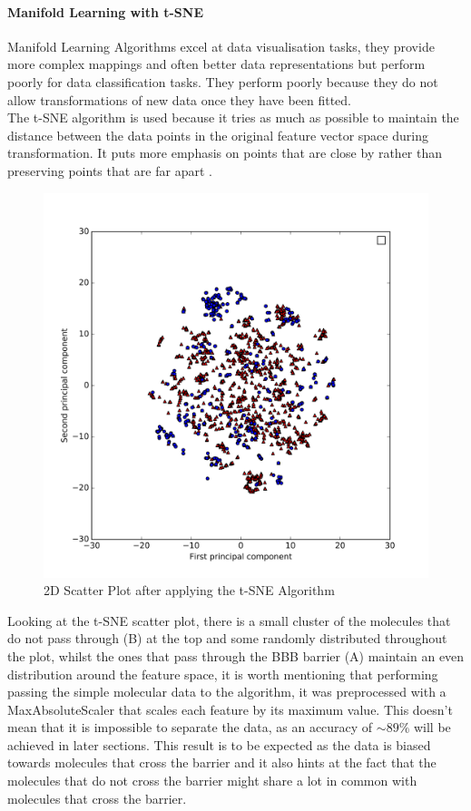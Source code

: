 \documentclass[a4paper,12pt]{report}
\begin{document}
			\paragraph{Manifold Learning with t-SNE}
			Manifold Learning Algorithms excel at data visualisation tasks, they provide more complex mappings and often better data representations but perform poorly for data classification tasks. They perform poorly because they do not allow transformations of new data once they have been fitted.\\
			The t-SNE algorithm is used because it tries as much as possible to maintain the distance between the data points in the original feature vector space during transformation. It puts more emphasis on points that are close by rather than preserving points that are far apart \cite{Mueller2016}.
				\begin{figure}[H]
					\centering
					\includegraphics[width=\textwidth,scale=1,totalheight=0.4\textheight]{images/scatter_tsne}
					\caption{2D Scatter Plot after applying the t-SNE Algorithm}
					\label{fig:scatter_tsne_2D}
				\end{figure}
			Looking at the t-SNE scatter plot, there is a small cluster of the molecules that do not pass through (B) at the top and some randomly distributed throughout the plot, whilst the ones that pass through the BBB barrier (A) maintain an even distribution around the feature space, it is worth mentioning that performing passing the simple molecular data to the algorithm, it was preprocessed with a MaxAbsoluteScaler that scales each feature by its maximum value. This doesn't mean that it is impossible to separate the data, as an accuracy of $\sim89\%$ will be achieved in later sections. This result is to be expected as the data is biased towards molecules that cross the barrier and it also hints at the fact that the molecules that do not cross the barrier might share a lot in common with molecules that cross the barrier.
\end{document}
